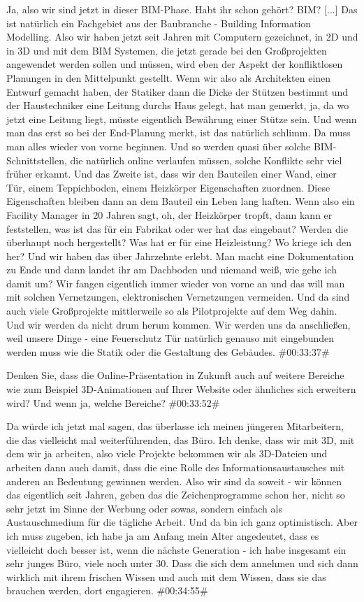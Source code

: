 \documentclass[a4paper, 12pt]{scrartcl}
\begin{document}
\begin{description}
\Andre Ja, also wir sind jetzt in dieser BIM-Phase. Habt ihr schon gehört? BIM? [...] Das ist natürlich ein Fachgebiet aus der Baubranche - Building Information Modelling. Also wir haben jetzt seit Jahren mit Computern gezeichnet, in 2D und in 3D und mit dem BIM Systemen, die jetzt gerade bei den Großprojekten angewendet werden sollen und müssen, wird eben der Aspekt der konfliktlosen Planungen in den Mittelpunkt gestellt. Wenn wir also als Architekten einen Entwurf gemacht haben, der Statiker dann die Dicke der Stützen bestimmt und der Haustechniker eine Leitung durchs Haus gelegt, hat man gemerkt, ja, da wo jetzt eine Leitung liegt, müsste eigentlich Bewährung einer Stütze sein. Und wenn man das erst so bei der End-Planung merkt, ist das natürlich schlimm. Da muss man alles wieder von vorne beginnen. Und so werden quasi über solche BIM-Schnittstellen, die natürlich online verlaufen müssen, solche Konflikte sehr viel früher erkannt. Und das Zweite ist, dass wir den Bauteilen einer Wand, einer Tür, einem Teppichboden, einem Heizkörper Eigenschaften zuordnen. Diese Eigenschaften bleiben dann an dem Bauteil ein Leben lang haften. Wenn also ein Facility Manager in 20 Jahren sagt, oh, der Heizkörper tropft, dann kann er feststellen, was ist das für ein Fabrikat oder wer hat das eingebaut? Werden die überhaupt noch hergestellt? Was hat er für eine Heizleistung? Wo kriege ich den her? Und wir haben das über Jahrzehnte erlebt. Man macht eine Dokumentation zu Ende und dann landet ihr am Dachboden und niemand weiß, wie gehe ich damit um? Wir fangen eigentlich immer wieder von vorne an und das will man mit solchen Vernetzungen, elektronischen Vernetzungen vermeiden. Und da sind auch viele Großprojekte mittlerweile so als Pilotprojekte auf dem Weg dahin. Und wir werden da nicht drum herum kommen. Wir werden uns da anschließen, weil unsere Dinge - eine Feuerschutz Tür natürlich genauso mit eingebunden werden muss wie die Statik oder die Gestaltung des Gebäudes. \#00:33:37\#

\Fabian Denken Sie, dass die Online-Präsentation in Zukunft auch auf weitere Bereiche wie zum Beispiel 3D-Animationen auf Ihrer Website oder ähnliches sich erweitern wird? Und wenn ja, welche Bereiche? \#00:33:52\#

\Andre Da würde ich jetzt mal sagen, das überlasse ich meinen jüngeren Mitarbeitern, die das vielleicht mal weiterführenden, das Büro. Ich denke, dass wir mit 3D, mit dem wir ja arbeiten, also viele Projekte bekommen wir als 3D-Dateien und arbeiten dann auch damit, dass die eine Rolle des Informationsaustausches mit anderen an Bedeutung gewinnen werden. Also wir sind da soweit - wir können das eigentlich seit Jahren, geben das die Zeichenprogramme schon her, nicht so sehr jetzt im Sinne der Werbung oder sowas, sondern einfach als Austauschmedium für die tägliche Arbeit. Und da bin ich ganz optimistisch. Aber ich muss zugeben, ich habe ja am Anfang mein Alter angedeutet, dass es vielleicht doch besser ist, wenn die nächste Generation - ich habe insgesamt ein sehr junges Büro, viele noch unter 30. Dass die sich dem annehmen und sich dann wirklich mit ihrem frischen Wissen und auch mit dem Wissen, dass sie das brauchen werden, dort engagieren. \#00:34:55\#


\end{description}
\end{document}
